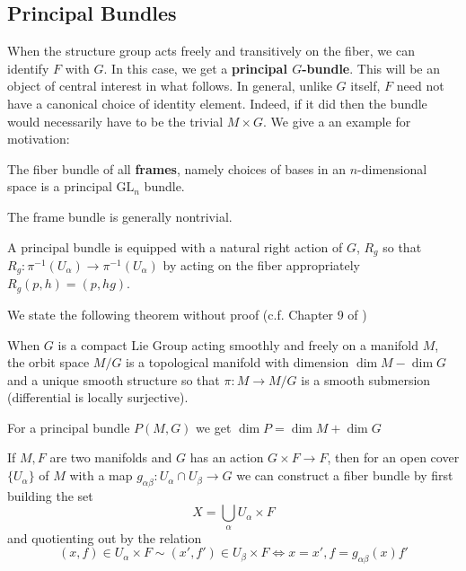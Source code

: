 		\subsection{Principal Bundles}
		
		When the structure group acts freely and transitively on the fiber, we can identify $F$ with $G$. In this case, we get a \textbf{principal $G$-bundle}. This will be an object of central interest in what follows. In general, unlike $G$ itself, $F$ need not have a canonical choice of identity element. Indeed, if it did then the bundle would necessarily have to be the trivial $M \times G$. We give a an example for motivation:
		\begin{eg}
			The fiber bundle of all \textbf{frames}, namely choices of bases in an $n$-dimensional space is a principal $\mathrm{GL}_n$ bundle.
		\end{eg}
		The frame bundle is generally nontrivial. 
		
		\begin{prop}
			A principal bundle is equipped with a natural right action of $G$, $R_g$ so that $R_g: \pi^{-1} (U_\alpha) \rightarrow \pi^{-1} (U_\alpha)$ by acting on the fiber appropriately $R_g (p, h) = (p, hg)$. 
		\end{prop}
		
		We state the following theorem without proof (c.f. Chapter 9 of \cite{lee2003})
		\begin{theorem}
			When $G$ is a compact Lie Group acting smoothly and freely on a manifold $M$, the orbit space $M/G$ is a topological manifold with dimension $\dim M - \dim G$ and a unique smooth structure so that $\pi: M \rightarrow M/G$ is a smooth submersion (differential is locally surjective). 
		\end{theorem}
		
		\begin{cor}
			For a principal bundle $P(M,G)$ we get $\dim P = \dim M + \dim G$
		\end{cor}
		
		If $M,F$ are two manifolds and $G$ has an action $G \times F \rightarrow F$, then for an open cover $\{ U_\alpha \}$ of $M$ with a map $g_{\alpha \beta}: U_{\alpha}\cap U_{\beta} \to G$ we can construct a fiber bundle by first building the set
		\begin{equation}
			X = \bigcup_\alpha U_\alpha \times F
		\end{equation} 
		and quotienting out by the relation
		\begin{equation}
			(x, f) \in U_\alpha \times F \sim (x', f') \in U_\beta \times F \Longleftrightarrow x=x', f=g_{\alpha \beta}(x) f' 
		\end{equation}
		

